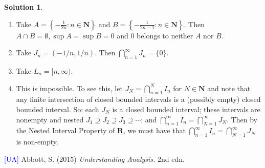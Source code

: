 \documentclass[12pt]{article}
\theoremstyle{definition}
\theoremstyle{exercise}
\theoremstyle{solution}
\newtheorem*{solution}{Solution}
\newcommand{\N}{\mathbf{N}}
\newcommand{\R}{\mathbf{R}}
\begin{document}
\begin{solution}
    \begin{enumerate}
        \item Take \( A = \left\{ -\tfrac{1}{2n} : n \in \N \right\} \) and \( B = \left\{ -\tfrac{1}{2n - 1} : n \in \N \right\} \). Then \( A \cap B = \emptyset, \sup A = \sup B = 0 \) and \( 0 \) belongs to neither \( A \) nor \( B \).

        \item Take \( J_n = (-1/n, 1/n) \). Then \( \bigcap_{n=1}^{\infty} J_n = \{ 0 \} \).

        \item Take \( L_n = [n, \infty) \).

        \item This is impossible. To see this, let \( J_N = \bigcap_{n=1}^N I_n \) for \( N \in \N \) and note that any finite intersection of closed bounded intervals is a (possibly empty) closed bounded interval. So: each \( J_N \) is a closed bounded interval; these intervals are nonempty and nested \( J_1 \supseteq J_2 \supseteq J_3 \supseteq \cdots \); and \( \bigcap_{n=1}^{\infty} I_n = \bigcap_{N=1}^{\infty} J_N \). Then by the Nested Interval Property of \( \R \), we must have that \( \bigcap_{n=1}^{\infty} I_n = \bigcap_{N=1}^{\infty} J_N \) is non-empty.
    \end{enumerate}
\end{solution}

\noindent \hrulefill

\noindent \hypertarget{ua}{\textcolor{blue}{[UA]} Abbott, S. (2015) \textit{Understanding Analysis.} 2nd edn.}
\end{document}

